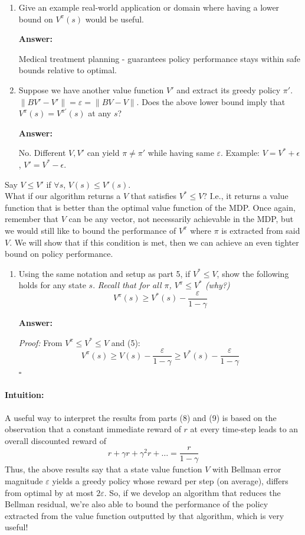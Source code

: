 \documentclass[12pt]{article}
\begin{document}
{{\begin{enumerate}[resume*]
    
    \item Give an example real-world application or domain where having a lower bound on $V^{\pi}(s)$ would be useful. 


    \textbf{Answer:}
    
    Medical treatment planning - guarantees policy performance stays within safe bounds relative to optimal.
    
    \item Suppose we have another value function $V'$ and extract its greedy policy $\pi'$. $\|BV' - V'\| = \varepsilon = \|BV - V\|$. Does the above lower bound imply that $V^{\pi}(s) = V^{\pi'}(s)$ at any $s$? 


    \textbf{Answer:}
    
    No. Different \(V, V'\) can yield \(\pi \neq \pi'\) while having same \(\varepsilon\). Example: \(V = V^* + \epsilon\), \(V' = V^* - \epsilon\).

 \end{enumerate}
    Say $V \leq V'$ if $\forall s$, $V(s) \leq V'(s)$.
\\
What if our algorithm returns a $V$ that satisfies $V^* \leq V$? I.e., it returns a value function that is better than the optimal value function of the MDP. Once again, remember that $V$ can be any vector, not necessarily achievable in the MDP, but we would still like to bound the performance of $V^{\pi}$ where $\pi$ is extracted from said $V$. We will show that if this condition is met, then we can achieve an even tighter bound on policy performance.
\begin{enumerate}[resume*]
    \item Using the same notation and setup as part 5, if $V^{\ast} \leq V$, show the following holds for any state $s$. \textit{Recall that for all $\pi$, $V^{\pi} \leq V^{\ast}$ (why?)} 
    \[
    V^{\pi}(s) \geq V^{\ast}(s) - \frac{\varepsilon}{1 - \gamma}
    \]


    \textbf{Answer:}   
    
    \textit{Proof:} From \(V^\pi \leq V^* \leq V\) and (5):
    \[
    V^\pi(s) \geq V(s) - \frac{\varepsilon}{1-\gamma} \geq V^*(s) - \frac{\varepsilon}{1-\gamma}
    \]
    \(\square\)


\end{enumerate}

\paragraph{Intuition:} A useful way to interpret the results from parts (8) and (9) is based on the observation that a constant immediate reward of $r$ at every time-step leads to an overall discounted reward of 
\[
r + \gamma r + \gamma^2 r + \dots = \frac{r}{1 - \gamma}
\]
Thus, the above results say that a state value function $V$ with Bellman error magnitude $\varepsilon$ yields a greedy policy whose reward per step (on average), differs from optimal by at most $2\varepsilon$. So, if we develop an algorithm that reduces the Bellman residual, we’re also able to bound the performance of the policy extracted from the value function outputted by that algorithm, which is very useful!

}}
\end{document}
